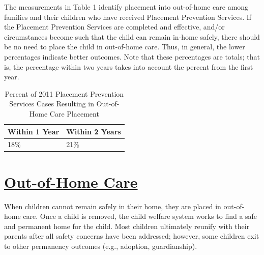 \documentclass{article}\usepackage[]{graphicx}\usepackage[]{color}
\begin{document}
The measurements in Table 1 identify placement into out-of-home care among families and their children who have received Placement Prevention Services. If the Placement Prevention Services are completed and effective, and/or circumstances become such that the child can remain in-home safely, there should be no need to place the child in out-of-home care. Thus, in general, the lower percentages indicate better outcomes. Note that these percentages are totals; that is, the percentage within two years takes into account the percent from the first year.
\vspace{12pt}
\begin{table}[ht]
\centering
\caption{Percent of 2011 Placement Prevention Services Cases Resulting in Out-of-Home Care Placement} 
\begin{tabular}{ll}
  \toprule
Within 1 Year & Within 2 Years \\ 
  \midrule
18\% & 21\% \\ 
   \bottomrule
\end{tabular}
\end{table}


\newpage
\section{\href{http://www.partnersforourchildren.org/data-portal/visualizations/out-home-care/trends}
    {Out-of-Home Care}
}
When children cannot remain safely in their home, they are placed in out-of-home care. Once a child is removed, the child welfare system works to find a safe and permanent home for the child. Most children ultimately reunify with their parents after all safety concerns have been addressed; however, some children exit to other permanency outcomes (e.g., adoption, guardianship).\\[6pt]

\label{p:ooh}
\end{document}
